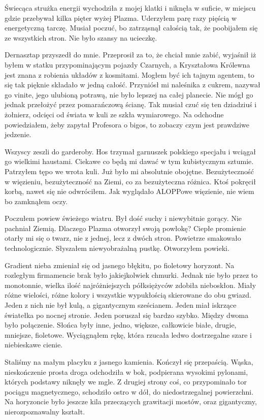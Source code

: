 Świecąca strużka energii wychodziła z mojej klatki i niknęła w suficie, w miejscu gdzie przebywał kilka pięter wyżej Plazma.
Uderzyłem parę razy pięścią w energetyczną tarczę.
Musiał poczuć, bo zatrząsnął całością tak, że poobijałem się ze wszystkich stron.
Nie było szansy na ucieczkę.

Dernasztap przyszedł do mnie. Przeprosił za to, że chciał mnie zabić, wyjaśnił iż byłem w statku przypominającym pojazdy Czarnych, a
Kryształowa Królewna jest znana z robienia układów z kosmitami. Mogłem być ich tajnym agentem, to się tak pięknie składało w jedną całość.
Przyniósł mi naleśnika z cukrem, nazywał go vinite, jego ulubioną potrawą, nie było lepszej na całej planecie. 
Nie mógł go jednak przełożyć przez pomarańczową ścianę. 
Tak musiał czuć się ten dziadziuś i żołnierz, odcięci od świata w kuli ze szkła wymiarowego.
Na odchodne powiedziałem, żeby zapytał Profesora o bigos, to zobaczy czym jest prawdziwe jedzenie. 

Wszyscy zeszli do garderoby. Hos trzymał garnuszek polskiego specjału i wciągał go wielkimi haustami. Ciekawe co będą mi dawać w tym kubistycznym sztumie.
Patrzyłem tępo we wrota kuli. Już było mi absolutnie obojętne. Bezużyteczność w więzieniu, bezużyteczność na Ziemi, co za bezużyteczna różnica.
Ktoś pokręcił korbą, nawet się nie odwróciłem.
Jak wyglądało ALOPPowe więzienie, nie wiem bo zamknąłem oczy.

Poczułem powiew świeżego wiatru.
Był dość suchy i niewybitnie gorący. Nie pachniał Ziemią.
Dlaczego Plazma otworzył swoją powłokę?
Ciepłe promienie otarły mi się o twarz, nie z jednej, lecz z dwóch stron.
Powietrze smakowało technologicznie.
Słyszałem niewyobrażalną pustkę.
Otworzyłem powieki.

Gradient nieba zmieniał się od jasnego błękitu, po fioletowy horyzont.
Na rozległym firmamencie brak było jakiejkolwiek chmurki.
Jednak nie było przez to monotonnie, wielka ilość najróżniejszych półksiężyców zdobiła nieboskłon.
Miały różne wielości, różne kolory i wszystkie wypukłością skierowane do obu gwiazd.
Jeden z nich nie był kulą, a gigantycznym sześcianem.
Jeden miał iskrzące światełka po nocnej stronie.
Jeden poruszał się bardzo szybko.
Między dwoma było połączenie.
Słońca były inne, jedno, większe, całkowicie białe, drugie, mniejsze, fioletowe.
Wyciągnąłem rękę, która rzucała ledwo dostrzegalne szare i niebieskawe cienie.

Staliśmy na małym placyku z jasnego kamienia. Kończył się przepaścią.
Wąska, nieskończenie prosta droga odchodziła w bok, podpierana wysokimi pylonami, których podstawy niknęły we mgle.
Z drugiej strony coś, co przypominało tor pociągu magnetycznego, schodziło ostro w dół, do niedostrzegalnej powierzchni.
Na horyzoncie było jeszcze kila przeczących grawitacji mostów, oraz gigantyczny, nierozpoznawalny kształt.

